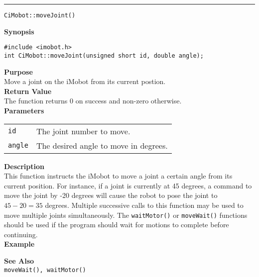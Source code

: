 \noindent
\vspace{5pt}
\rule{6.5in}{0.015in}
\noindent
{\LARGE \texttt{CiMobot::moveJoint()}}\\
{}

\noindent
{\bf Synopsis}\\
\begin{verbatim}
#include <imobot.h>
int CiMobot::moveJoint(unsigned short id, double angle);
\end{verbatim}

\noindent
{\bf Purpose}\\
Move a joint on the iMobot from its current postion.\\

\noindent
{\bf Return Value}\\
The function returns 0 on success and non-zero otherwise.\\

\noindent
{\bf Parameters}
\vspace{-0.1in}
\begin{description}
\item               
\begin{tabular}{p{10 mm}p{145 mm}}
\texttt{id} & The joint number to move. \\
\texttt{angle} & The desired angle to move in degrees.
\end{tabular}
\end{description}

\noindent
{\bf Description}\\
This function instructs the iMobot to move a joint a certain angle from its current position.
For instance, if a joint is currently at 45 degrees, a command to move the joint by -20 degrees will cause the robot to pose the joint to $45-20 = 35$ degrees.
Multiple successive calls to this function may be used to move multiple joints
simultaneously. The \texttt{waitMotor()} or \texttt{moveWait()} functions should
be used if the program should wait for motions to complete before continuing. \\

\noindent
{\bf Example}\\
\noindent

\noindent
{\bf See Also}\\
\texttt{moveWait(), waitMotor()}

